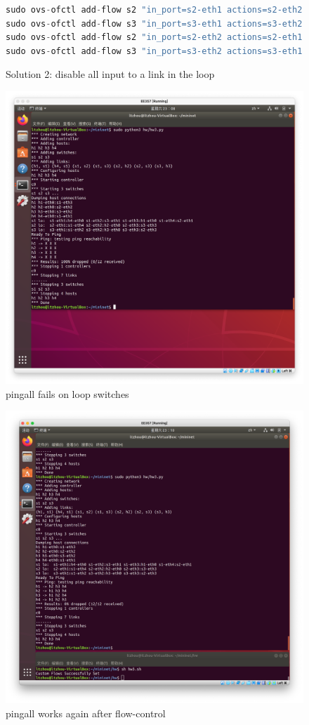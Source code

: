 \begin{figure}[!h]
    \caption{Solution 2: disable all input to a link in the loop}
    \label{code:sol2}
\begin{lstlisting}[language=C,frame=single]
sudo ovs-ofctl add-flow s2 "in_port=s2-eth1 actions=s2-eth2"                    # s1 -> s2 -> h2
sudo ovs-ofctl add-flow s3 "in_port=s3-eth1 actions=s3-eth2"                    # s1 -> s3 -> h3
sudo ovs-ofctl add-flow s2 "in_port=s2-eth2 actions=s2-eth1"                    # h2 -> s2 -> s1
sudo ovs-ofctl add-flow s3 "in_port=s3-eth2 actions=s3-eth1"                    # h3 -> s3 -> s1
\end{lstlisting}
\end{figure}


\begin{figure}[hb]
  \begin{center}
  \includegraphics[width=12cm]{img/lab2/ex3-1}
  \caption{pingall fails on loop switches}
  \label{fig:ex3-1}
  \end{center}
\end{figure}

\begin{figure}[hb]
    \begin{center}
    \includegraphics[width=12cm]{img/lab2/ex3-2}
    \caption{pingall works again after flow-control}
    \label{fig:ex3-2}
    \end{center}
  \end{figure}